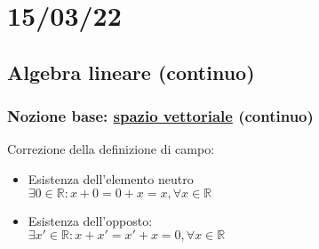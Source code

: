 \documentclass{article}
\newcommand{\ul}[1]{\underline{#1}}
\newcommand{\R}{\mathbb{R}}
\begin{document}
\section{15/03/22}
\subsection{Algebra lineare (continuo)}
\subsubsection*{Nozione base: \ul{spazio vettoriale} (continuo)}
Correzione della definizione di campo:
\begin{itemize}
	\item Esistenza dell'elemento neutro\\$\exists0\in\R:x+0=0+x=x,\forall x\in\R$
	\item Esistenza dell'opposto:\\$\exists x'\in\R:x+x'=x'+x=0,\forall x\in\R$
\end{itemize}
\hrulefill
\end{document}
